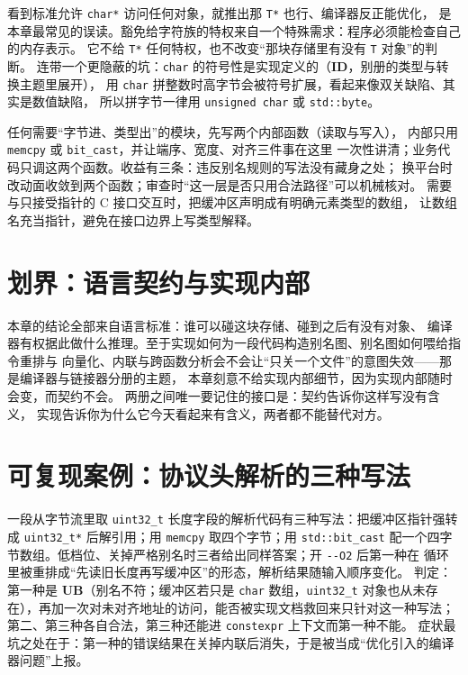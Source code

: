 \documentclass[12pt,a4paper,fontset=fandol]{ctexbook}
\newcommand{\Tp}[1]{\texttt{#1}}
\newcommand{\Opt}[1]{\texttt{-\/-#1}}
\newcommand{\Bk}{\discretionary{}{}{}}
\newcommand{\Lang}[1]{\textsf{#1}}
\newcommand{\CL}{\Lang{C}}
\newcommand{\UB}{\textbf{\textsf{UB}}}
\newcommand{\IDB}{\textbf{\textsf{ID}}}
\begin{document}
\begin{warning}[title={字符豁免被用来“顺便”证明强转合法}]
看到标准允许 \Tp{char*} 访问任何对象，就推出那 \Tp{T*} 也行、编译器反正能优化，
是本章最常见的误读。豁免给字符族的特权来自一个特殊需求：程序必须能检查自己的内存表示。
它不给 \Tp{T*} 任何特权，也不改变“那块存储里有没有 \Tp{T} 对象”的判断。
连带一个更隐蔽的坑：\Tp{char} 的符号性是实现定义的（\IDB{}，别册的类型与转换主题里展开），
用 \Tp{char} 拼整数时高字节会被符号扩展，看起来像双关缺陷、其实是数值缺陷，
所以拼字节一律用 \Tp{unsigned char} 或 \Tp{std::byte}。
\end{warning}

\begin{bestpractice}[title={把类型解释压到一层薄薄的封装里}]
任何需要“字节进、类型出”的模块，先写两个内部函数（读取与写入），
内部只用 \Tp{memcpy} 或 \Tp{bit{\Bk}\_cast}，并让端序、宽度、对齐三件事在这里
一次性讲清；业务代码只调这两个函数。收益有三条：违反别名规则的写法没有藏身之处；
换平台时改动面收敛到两个函数；审查时“这一层是否只用合法路径”可以机械核对。
需要与只接受指针的 \CL{} 接口交互时，把缓冲区声明成有明确元素类型的数组，
让数组名充当指针，避免在接口边界上写类型解释。
\end{bestpractice}

\section{划界：语言契约与实现内部}\label{sec:ub06-boundary}

本章的结论全部来自语言标准：谁可以碰这块存储、碰到之后有没有对象、
编译器有权据此做什么推理。至于实现如何为一段代码构造别名图、别名图如何喂给指令重排与
向量化、内联与跨函数分析会不会让“只关一个文件”的意图失效——那是编译器与链接器分册的主题，
本章刻意不给实现内部细节，因为实现内部随时会变，而契约不会。
两册之间唯一要记住的接口是：契约告诉你这样写没有含义，
实现告诉你为什么它今天看起来有含义，两者都不能替代对方。

\section{可复现案例：协议头解析的三种写法}\label{sec:ub06-case}

\begin{casebox}[title={同一段解析代码的三种命运}]
一段从字节流里取 \Tp{uint32\_t} 长度字段的解析代码有三种写法：把缓冲区指针强转成
\Tp{uint32\_t*} 后解引用；用 \Tp{memcpy} 取四个字节；用 \Tp{std::bit{\Bk}\_cast}
配一个四字节数组。低档位、关掉严格别名时三者给出同样答案；开 \Opt{O2} 后第一种在
循环里被重排成“先读旧长度再写缓冲区”的形态，解析结果随输入顺序变化。
判定：第一种是 \UB{}（别名不符；缓冲区若只是 \Tp{char} 数组，\Tp{uint32\_t}
对象也从未存在），再加一次对未对齐地址的访问，能否被实现文档救回来只针对这一种写法；
第二、第三种各自合法，第三种还能进 \Tp{constexpr} 上下文而第一种不能。
症状最坑之处在于：第一种的错误结果在关掉内联后消失，于是被当成“优化引入的编译器问题”上报。
\end{casebox}
\end{document}

